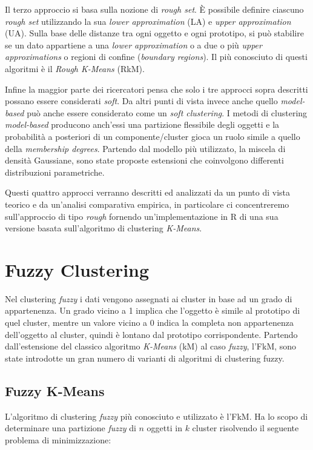 \documentclass[12pt]{article}
\begin{document}
Il terzo approccio si basa sulla nozione di \textit{rough set}. È possibile definire ciascuno
\textit{rough set} utilizzando la sua \textit{lower approximation} (LA) e \textit{upper approximation} (UA). Sulla base delle distanze tra ogni oggetto e ogni prototipo, si può stabilire se un dato appartiene a una \textit{lower approximation} o a due o più \textit{upper approximations} o regioni di confine (\textit{boundary regions}). Il più conosciuto di questi algoritmi è il \textit{Rough K-Means} (RkM).

Infine la maggior parte dei ricercatori pensa che solo i tre approcci sopra descritti possano essere considerati \textit{soft}. Da altri punti di vista invece anche quello \textit{model-based} può anche essere considerato come un \textit{soft clustering}. I metodi di clustering \textit{model-based} producono anch'essi una partizione flessibile degli oggetti e la probabilità a posteriori di un componente/cluster gioca un ruolo simile a quello della \textit{membership degrees}. Partendo dal modello più utilizzato, la miscela di densità Gaussiane, sono state proposte estensioni che coinvolgono differenti distribuzioni parametriche.

Questi quattro approcci verranno descritti ed analizzati da un punto di vista teorico e da un'analisi comparativa empirica, in particolare ci concentreremo sull'approccio di tipo \textit{rough} fornendo un'implementazione in R di una sua versione basata sull'algoritmo di clustering \textit{K-Means}.

\section{Fuzzy Clustering}

Nel clustering \textit{fuzzy} i dati vengono assegnati ai cluster in base ad un grado di appartenenza. Un grado vicino a 1 implica che l'oggetto è simile al prototipo di quel cluster, mentre un valore vicino a 0 indica la completa non appartenenza dell'oggetto al cluster,
quindi è lontano dal prototipo corrispondente. Partendo dall'estensione del classico algoritmo \textit{K-Means} (kM) al caso \textit{fuzzy}, l'FkM, sono state introdotte un gran numero di varianti di algoritmi di clustering fuzzy.

\subsection{Fuzzy K-Means}

L'algoritmo di clustering \textit{fuzzy} più conosciuto e utilizzato è l'FkM. Ha lo scopo di determinare una partizione \textit{fuzzy} di $n$ oggetti in $k$ cluster risolvendo il seguente problema di minimizzazione:
\end{document}
